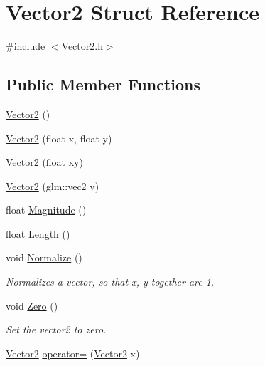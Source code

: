 \hypertarget{struct_vector2}{}\section{Vector2 Struct Reference}
\label{struct_vector2}


{\ttfamily \#include $<$Vector2.\+h$>$}

\subsection*{Public Member Functions}
\begin{DoxyCompactItemize}
\item 
\mbox{\hyperlink{struct_vector2_a22104d1809be26a419ef1f959e3761bf}{Vector2}} ()
\item 
\mbox{\hyperlink{struct_vector2_a061ab58a0e216c759d64e3746d712b12}{Vector2}} (float x, float y)
\item 
\mbox{\hyperlink{struct_vector2_acd4630b163df63998669c10e1971b2d6}{Vector2}} (float xy)
\item 
\mbox{\hyperlink{struct_vector2_a8a6a520209bbcd7db3d59f8a0c9e3b2f}{Vector2}} (glm\+::vec2 v)
\item 
float \mbox{\hyperlink{struct_vector2_afd0eb6f05e1a15b3d8656d5e0e12798a}{Magnitude}} ()
\item 
float \mbox{\hyperlink{struct_vector2_ae7b80a14336e86c30a11218cd27a4abf}{Length}} ()
\item 
\mbox{\label{struct_vector2_a3b597b3bfeb114dd9e157b86330e087d}} 
void \mbox{\hyperlink{struct_vector2_a3b597b3bfeb114dd9e157b86330e087d}{Normalize}} ()
\begin{DoxyCompactList}\small\item\em Normalizes a vector, so that x, y together are 1. \end{DoxyCompactList}\item 
\mbox{\label{struct_vector2_aa07e77bd513051b31f080bd70a7d09d7}} 
void \mbox{\hyperlink{struct_vector2_aa07e77bd513051b31f080bd70a7d09d7}{Zero}} ()
\begin{DoxyCompactList}\small\item\em Set the vector2 to zero. \end{DoxyCompactList}\item 
\mbox{\hyperlink{struct_vector2}{Vector2}} \mbox{\hyperlink{struct_vector2_a7e9bf2ca75c051fe51cbc8a484923d6d}{operator=}} (\mbox{\hyperlink{struct_vector2}{Vector2}} x)

\end{DoxyCompactItemize}
